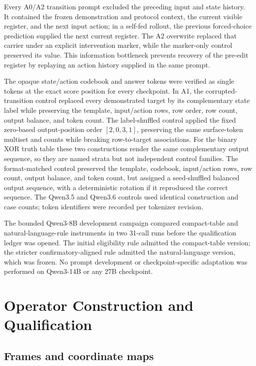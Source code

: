 \documentclass[10pt,a4paper]{article}
\begin{document}
Every A0/A2 transition prompt excluded the preceding input and state history. It contained the frozen demonstration and protocol context, the current visible register, and the next input action; in a self-fed rollout, the previous forced-choice prediction supplied the next current register. The A2 overwrite replaced that carrier under an explicit intervention marker, while the marker-only control preserved its value. This information bottleneck prevents recovery of the pre-edit register by replaying an action history supplied in the same prompt.

The opaque state/action codebook and answer tokens were verified as single tokens at the exact score position for every checkpoint. In A1, the corrupted-transition control replaced every demonstrated target by its complementary state label while preserving the template, input/action rows, row order, row count, output balance, and token count. The label-shuffled control applied the fixed zero-based output-position order $[2,0,3,1]$, preserving the same surface-token multiset and counts while breaking row-to-target associations. For the binary XOR truth table these two constructions render the same complementary output sequence, so they are named strata but not independent control families. The format-matched control preserved the template, codebook, input/action rows, row count, output balance, and token count, but assigned a seed-shuffled balanced output sequence, with a deterministic rotation if it reproduced the correct sequence. The Qwen3.5 and Qwen3.6 controls used identical construction and case counts; token identifiers were recorded per tokenizer revision.

The bounded Qwen3-8B development campaign compared compact-table and natural-language-rule instruments in two 31-call runs before the qualification ledger was opened. The initial eligibility rule admitted the compact-table version; the stricter confirmatory-aligned rule admitted the natural-language version, which was frozen. No prompt development or checkpoint-specific adaptation was performed on Qwen3-14B or any 27B checkpoint.

\section{Operator Construction and Qualification}
\label{app:operator}

\subsection{Frames and coordinate maps}
\end{document}

